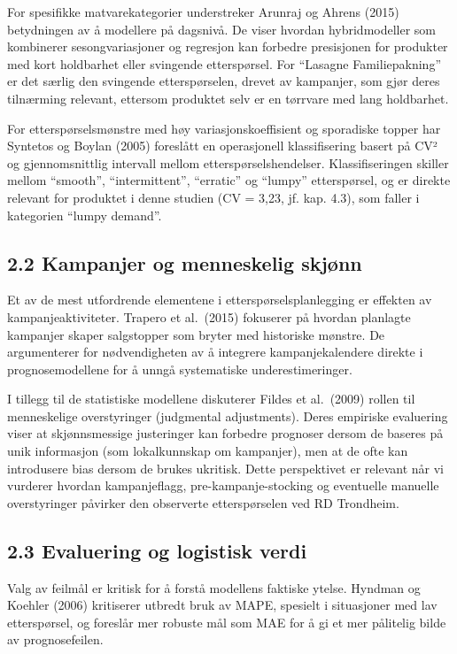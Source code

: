 \documentclass[
  norsk,
  11pt,
  a4paper,
]{article}
\begin{document}
For spesifikke matvarekategorier understreker Arunraj og Ahrens (2015)
betydningen av å modellere på dagsnivå. De viser hvordan hybridmodeller
som kombinerer sesongvariasjoner og regresjon kan forbedre presisjonen
for produkter med kort holdbarhet eller svingende etterspørsel. For
``Lasagne Familiepakning'' er det særlig den svingende etterspørselen,
drevet av kampanjer, som gjør deres tilnærming relevant, ettersom
produktet selv er en tørrvare med lang holdbarhet.

For etterspørselsmønstre med høy variasjonskoeffisient og sporadiske
topper har Syntetos og Boylan (2005) foreslått en operasjonell
klassifisering basert på CV² og gjennomsnittlig intervall mellom
etterspørselshendelser. Klassifiseringen skiller mellom ``smooth'',
``intermittent'', ``erratic'' og ``lumpy'' etterspørsel, og er direkte
relevant for produktet i denne studien (CV = 3,23, jf. kap. 4.3), som
faller i kategorien ``lumpy demand''.

\subsection{2.2 Kampanjer og menneskelig
skjønn}\label{kampanjer-og-menneskelig-skjuxf8nn}

Et av de mest utfordrende elementene i etterspørselsplanlegging er
effekten av kampanjeaktiviteter. Trapero et al.~(2015) fokuserer på
hvordan planlagte kampanjer skaper salgstopper som bryter med historiske
mønstre. De argumenterer for nødvendigheten av å integrere
kampanjekalendere direkte i prognosemodellene for å unngå systematiske
underestimeringer.

I tillegg til de statistiske modellene diskuterer Fildes et al.~(2009)
rollen til menneskelige overstyringer (judgmental adjustments). Deres
empiriske evaluering viser at skjønnsmessige justeringer kan forbedre
prognoser dersom de baseres på unik informasjon (som lokalkunnskap om
kampanjer), men at de ofte kan introdusere bias dersom de brukes
ukritisk. Dette perspektivet er relevant når vi vurderer hvordan
kampanjeflagg, pre-kampanje-stocking og eventuelle manuelle
overstyringer påvirker den observerte etterspørselen ved RD Trondheim.

\subsection{2.3 Evaluering og logistisk
verdi}\label{evaluering-og-logistisk-verdi}

Valg av feilmål er kritisk for å forstå modellens faktiske ytelse.
Hyndman og Koehler (2006) kritiserer utbredt bruk av MAPE, spesielt i
situasjoner med lav etterspørsel, og foreslår mer robuste mål som MAE
for å gi et mer pålitelig bilde av prognosefeilen.
\end{document}
